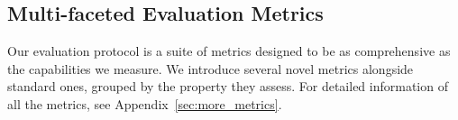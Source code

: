 






\subsection{Multi-faceted Evaluation Metrics}
\label{ssec:metrics}
Our evaluation protocol is a suite of metrics designed to be as comprehensive as the capabilities we measure. We introduce several novel metrics alongside standard ones, grouped by the property they assess. For detailed information of all the metrics, see Appendix~\ref{sec:more_metrics}.

